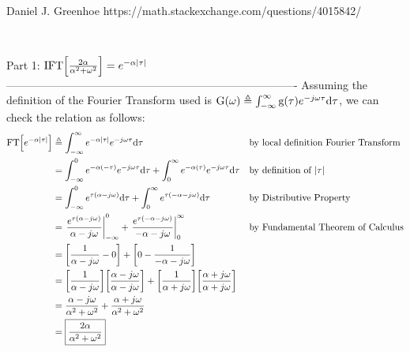 Daniel J. Greenhoe
https://math.stackexchange.com/questions/4015842/


$\newcommand{\eqd}{\triangleq}$
$\newcommand{\eqa}{\approx}$
$\newcommand{\abs}[1]{{\left\lvert #1 \right\rvert}}$
$\newcommand{\brp}[1]{{\left(#1\right)}}$
$\newcommand{\brs}[1]{{\left[#1\right]}}$
$\newcommand{\brlr}[1]{\left.#1\right|}$
$\newcommand{\deriv} [2]   {{\frac{\mathrm{d}#1}{\mathrm{d}#2} }}$
$\newcommand{\R}{\Bbb{R}}$
$\newcommand{\intcc} [2]  {{\left[#1:#2\right]}}$
$\newcommand{\intoo} [2]  {{\left(#1:#2\right)}}$
$\newcommand{\intoc} [2]  {{\left(#1:#2\right]}}$
$\newcommand{\intco} [2]  {{\left[#1:#2\right)}}$
$\newcommand{\ff}{\mathrm{f}}$
$\newcommand{\fF}{\mathrm{F}}$
$\newcommand{\fG}{\mathrm{G}}$
$\newcommand{\fg}{\mathrm{g}}$
$\newcommand{\fphi}{\mathrm{\phi}}$
$\newcommand{\dx}{\mathrm{dx}}$
$\newcommand{\dtau}{\mathrm{d\tau}}$
$\newcommand{\du}{\mathrm{du}}$
$\newcommand{\dv}{\mathrm{dv}}$
$\newcommand{\ds}{\displaystyle}$
$\newcommand{\thme}[1]{#1}$
$\newcommand{\opFT}{\mathrm{FT}}$
$\newcommand{\opIFT}{\mathrm{IFT}}$
$\newcommand{\thme}[1]{#1}$

Part 1: $\opIFT\brs{\frac{2\alpha}{\alpha^2+\omega^2}} = e^{-\alpha\abs{\tau}}$
-------------------------------------------------------------------------------
Assuming the definition of the Fourier Transform used is
$\fG(\omega)\eqd \int_{-\infty}^{\infty}\fg(\tau)e^{-j\omega\tau}\dtau$,
we can check the relation as follows:
\begin{align}
  \opFT\brs{e^{-\alpha\abs{\tau}}}
    &\eqd \int_{-\infty}^{\infty} e^{-\alpha\abs{\tau}} e^{-j\omega\tau}\dtau
    && \text{by local definition Fourier Transform}
  \\&= \int_{-\infty}^{0} e^{-\alpha(-\tau)} e^{-j\omega\tau}\dtau
     + \int_{0}^{\infty} e^{-\alpha(\tau)} e^{-j\omega\tau}\dtau
    && \text{by definition of $\abs{\tau}$}
  \\&= \int_{-\infty}^{0} e^{\tau(\alpha-j\omega)}\dtau
     + \int_{0}^{\infty} e^{\tau(-\alpha-j\omega)}\dtau
    && \text{by Distributive Property}
  \\&= \brlr{\frac{e^{\tau(\alpha-j\omega)}}{\alpha-j\omega}}_{-\infty}^{0}
     + \brlr{\frac{e^{\tau(-\alpha-j\omega)}}{-\alpha-j\omega}}_{0}^{\infty}
    && \text{by Fundamental Theorem of Calculus}
  \\&= \brs{\frac{1}{\alpha-j\omega} - 0}
     + \brs{0- \frac{1}{-\alpha-j\omega}}
  \\&= \brs{\frac{1}{\alpha-j\omega}}\brs{\frac{\alpha-j\omega}{\alpha-j\omega}}
     + \brs{\frac{1}{\alpha+j\omega}}\brs{\frac{\alpha+j\omega}{\alpha+j\omega}}
  \\&= \frac{\alpha-j\omega}{\alpha^2+\omega^2}
     + \frac{\alpha+j\omega}{\alpha^2+\omega^2}
  \\&= \boxed{\frac{2\alpha}{\alpha^2+\omega^2}}
\end{align}

